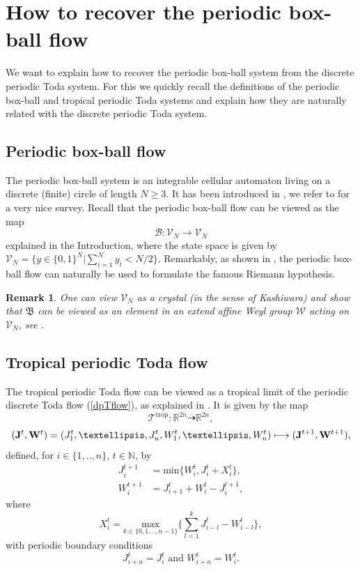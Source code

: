 \documentclass[11pt, a4paper]{amsart}
\newcommand{\eqsp}[1]{\begin{equation} \begin{split}
 #1\end{split}\end{equation}}
\newcommand{\eqst}[1]{\begin{equation*}#1\end{equation*}}
\theoremstyle{plain}
\newtheorem{remark}{Remark}[section]
\numberwithin{equation}{section}
\begin{document}
\section{How to recover the periodic box-ball flow}
We want to explain how to recover the periodic box-ball system from the discrete periodic Toda system. For this we quickly recall the definitions of the periodic box-ball and tropical periodic Toda systems and explain how they are naturally related with the discrete periodic Toda system.
\subsection{Periodic box-ball flow}
The periodic box-ball system is an integrable cellular automaton living on a discrete (finite) circle of length $N \geq 3$. It has been introduced in \cite{yura}, we refer to \cite{inoue} for a very nice survey. 
Recall that the periodic box-ball flow can be viewed as the map \eqst{\mathcal  B : \mathcal V_N \longrightarrow \mathcal V_N} explained in the Introduction, where the state space is given by $\mathcal V _N = \{ y \in \{0,1\}^N \vert \sum_{i=1}^N y_i < N/2 \}$. Remarkably, as shown in \cite{riemann}, the periodic box-ball flow can naturally be used to formulate the famous Riemann hypothesis.
\begin{remark}
One can view $\mathcal V _N$ as a crystal (in the sense of Kashiwara) and show that $\mathfrak B$ can be viewed as an element in an extend affine Weyl group $\mathcal W$ acting on $\mathcal V _N$, see \cite{inoue}.
\end{remark}


\subsection{Tropical periodic Toda flow}
\label{sec-trop-toda}
The tropical periodic Toda flow can be viewed as a tropical limit of the periodic discrete Toda flow (\ref{dpTflow}), as explained in \cite{tokihiro1,inoue}. 
It is given by the map \eqst{  \mathcal T^{\mathrm{trop}} : \mathbb R ^{2n} \dashrightarrow \mathbb R^{2n},}  \eqst{ (\bold{J}^t,\bold{W}^t) =  (J_1^t,\dots,J_n^t,W_1^t,\dots,W_n^t) \longmapsto (\bold{J}^{t+1},\bold{W}^{t+1}) ,} defined, for $i \in \{1,..,n\}$, $t \in \mathbb N$, by 
\eqsp{
J^{t+1}_i &= \mathrm{min}\{W^t_i,J_i^t + X_i^t\} ,\\ 
W^{t+1}_i &= J^t_{i+1}+W^t_i-J^{t+1}_i,}
where 
\eqst{X_i^t = \underset{{k \in \{0,1,..,n-1\}}}{\mathrm{max}}\{\sum_{l=1}^k J_{i-l}^t - W_{i-l}^t\},
}
with periodic boundary conditions 
\eqst{
J^t_{i+n} = J^t_i \text{ and } W^t_{i+n} = W^t_i.}
\end{document}
